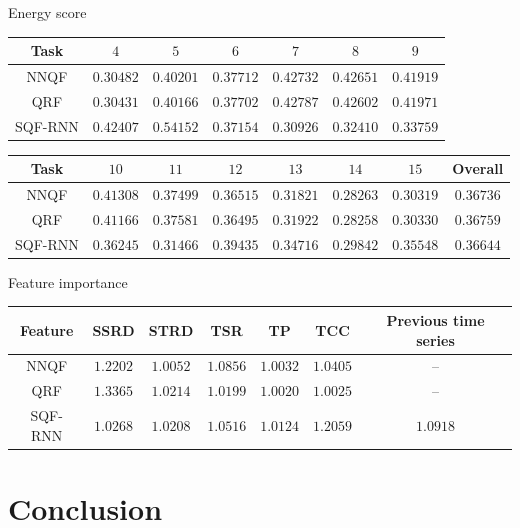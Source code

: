 \documentclass[10pt,aspectratio=169]{beamer}
\begin{document}
\begin{frame}[fragile]{Energy score}
    \renewcommand{\b}[1]{\mathbf{#1}}
    \begin{tabular}{c|cccccc}
        Task & \(4\) & \(5\) & \(6\) & \(7\) & \(8\) & \(9\) \\
        \hline
        NNQF    & \(0.30482\)     & \(0.40201\)     & \(0.37712\)     & \(0.42732\)     & \(0.42651\)     & \(0.41919\)     \\
        QRF     & \(\b{0.30431}\) & \(\b{0.40166}\) & \(0.37702\)     & \(0.42787\)     & \(0.42602\)     & \(0.41971\)     \\
        SQF-RNN & \(0.42407\)     & \(0.54152\)     & \(\b{0.37154}\) & \(\b{0.30926}\) & \(\b{0.32410}\) & \(\b{0.33759}\)
    \end{tabular}
    \begin{tabular}{c|cccccc|c}
        Task & \(10\) & \(11\) & \(12\) & \(13\) & \(14\) & \(15\) & Overall \\
        \hline
        NNQF    & \(0.41308\)     & \(0.37499\)     & \(0.36515\)     & \(\b{0.31821}\) & \(0.28263\)     & \(\b{0.30319}\) & \(0.36736\)     \\
        QRF     & \(0.41166\)     & \(0.37581\)     & \(\b{0.36495}\) & \(0.31922\)     & \(\b{0.28258}\) & \(0.30330\)     & \(0.36759\)     \\
        SQF-RNN & \(\b{0.36245}\) & \(\b{0.31466}\) & \(0.39435\)     & \(0.34716\)     & \(0.29842\)     & \(0.35548\)     & \(\b{0.36644}\)
    \end{tabular}
\end{frame}

\begin{frame}{Feature importance}
    \begin{tabular}{c|cccccc}
        Feature & SSRD & STRD & TSR & TP & TCC & Previous time series \\
        \hline
        NNQF    & \(1.2202\) & \(1.0052\) & \(1.0856\) & \(1.0032\) & \(1.0405\) & -- \\
        QRF     & \(1.3365\) & \(1.0214\) & \(1.0199\) & \(1.0020\) & \(1.0025\) & -- \\
        SQF-RNN & \(1.0268\) & \(1.0208\) & \(1.0516\) & \(1.0124\) & \(1.2059\) & \(1.0918\)
    \end{tabular}
\end{frame}

\section{Conclusion}
\end{document}
